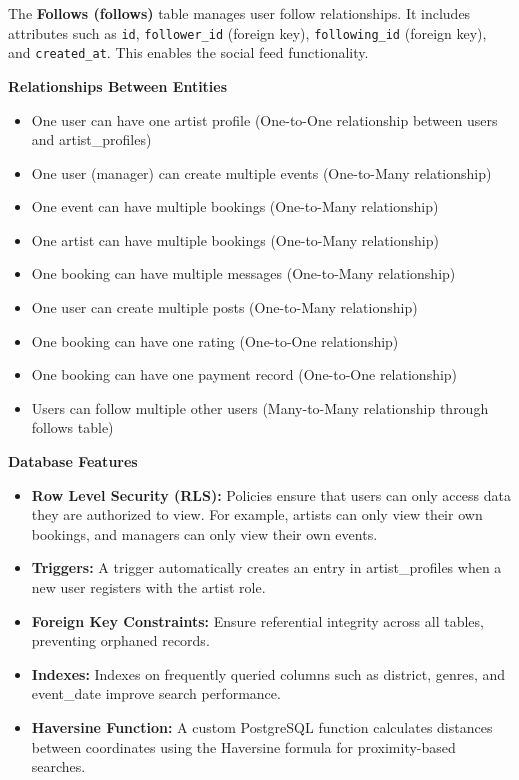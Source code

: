 \documentclass[12pt,a4paper]{report}
\begin{document}
The \textbf{Follows (follows)} table manages user follow relationships. It includes attributes such as \texttt{id}, \texttt{follower\_id} (foreign key), \texttt{following\_id} (foreign key), and \texttt{created\_at}. This enables the social feed functionality.

\vspace{0.3cm}

\textbf{Relationships Between Entities}

\begin{itemize}
\item One user can have one artist profile (One-to-One relationship between users and artist\_profiles)
\item One user (manager) can create multiple events (One-to-Many relationship)
\item One event can have multiple bookings (One-to-Many relationship)
\item One artist can have multiple bookings (One-to-Many relationship)
\item One booking can have multiple messages (One-to-Many relationship)
\item One user can create multiple posts (One-to-Many relationship)
\item One booking can have one rating (One-to-One relationship)
\item One booking can have one payment record (One-to-One relationship)
\item Users can follow multiple other users (Many-to-Many relationship through follows table)
\end{itemize}

\vspace{0.3cm}

\textbf{Database Features}

\begin{itemize}
\item \textbf{Row Level Security (RLS):} Policies ensure that users can only access data they are authorized to view. For example, artists can only view their own bookings, and managers can only view their own events.

\item \textbf{Triggers:} A trigger automatically creates an entry in artist\_profiles when a new user registers with the artist role.

\item \textbf{Foreign Key Constraints:} Ensure referential integrity across all tables, preventing orphaned records.

\item \textbf{Indexes:} Indexes on frequently queried columns such as district, genres, and event\_date improve search performance.

\item \textbf{Haversine Function:} A custom PostgreSQL function calculates distances between coordinates using the Haversine formula for proximity-based searches.
\end{itemize}
\end{document}
